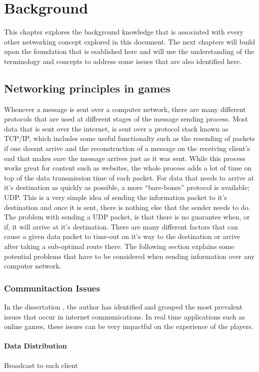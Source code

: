 \chapter{Background}
This chapter explores the background knowledge that is associated with every other networking concept explored in this document. The next chapters will build upon the foundation that is esablished here and will use the understanding of the terminology and concepts to address some issues that are also identified here.


\section{Networking principles in games}
Whenever a message is sent over a computer network, there are many different protocols that are used at different stages of the message sending process. Most data that is sent over the internet, is sent over a protocol stack known as TCP/IP, which includes some useful functionalty such as the resending of packets if one doesnt arrive and the reconstruction of a message on the receiving client's end that makes sure the message arrives just as it was sent. While this process works great for content such as websites, the whole process adds a lot of time on top of the data transmission time of each packet. For data that needs to arrive at it's destination as quickly as possible, a more ``bare-bones'' protocol is available; UDP. This is a very simple idea of sending the information packet to it's destination and once it is sent, there is nothing else that the sender needs to do. The problem with sending a UDP packet, is that there is no guarantee when, or if, it will arrive at it's destination. There are many different factors that can cause a given data packet to time-out on it's way to the destination or arrive after taking a sub-optimal route there. The following section explains some potential problems that have to be considered when sending information over any computer network.


\subsection{Communitaction Issues}
In the dissertation , the author has identified and grouped the most prevalent issues that occur in internet communications. In real time applications such as online games, these issues can be very impactful on the experience of the players.

\subsubsection{Data Distribution}
Broadcast to each client

